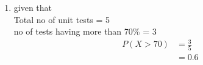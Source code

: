 \renewcommand{\theequation}{\theenumi}
\begin{enumerate}[label=\arabic*.,ref=\thesubsection.\theenumi]
\item given that 
\\
Total no of unit tests = 5
\\
no of tests having more than 70\%  = 3
\begin{align}
P\left(X>70\right) &= \frac{3}{5}
\\
&= 0.6
\end{align}
\end{enumerate}